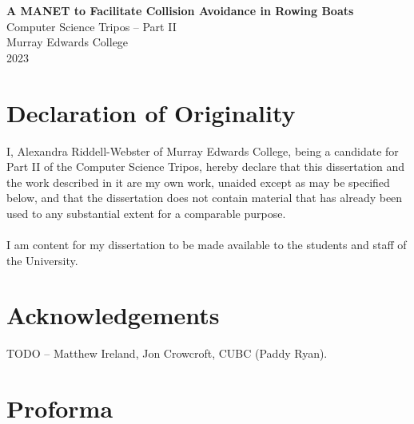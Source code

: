 \documentclass[12pt,a4paper]{report}
\begin{document}


\thispagestyle{empty}


\vspace*{60mm}
\begin{center}
\Huge
\textbf{A MANET to Facilitate Collision Avoidance in Rowing Boats} \\[5mm]
Computer Science Tripos -- Part II \\[5mm]
Murray Edwards College \\[5mm]
2023
\end{center}

\pagestyle{plain}
\chapter*{Declaration of Originality}

I, Alexandra Riddell-Webster of Murray Edwards College, being a candidate for Part II of the Computer Science Tripos, hereby declare that this dissertation and the work described in it are my own work, unaided except as may be specified below, and that the dissertation does not contain material that has already been used to any substantial extent for a comparable purpose. \\ \\
I am content for my dissertation to be made available to the students and staff of the
University. \\

\bigskip
{}

\chapter*{Acknowledgements}
TODO -- Matthew Ireland, Jon Crowcroft, CUBC (Paddy Ryan).



\chapter*{Proforma}
\end{document}
